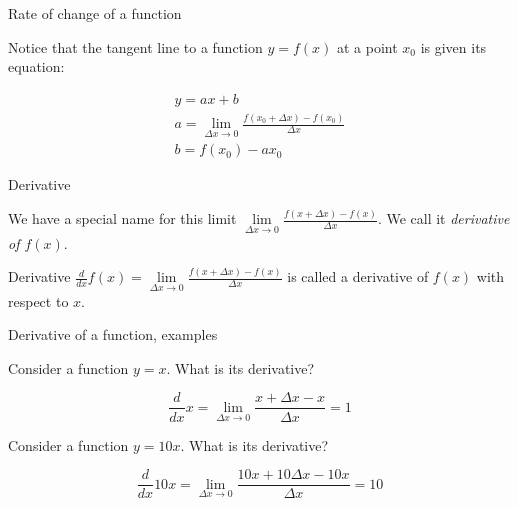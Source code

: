 \documentclass{beamer}
\begin{document}
\begin{frame}{Rate of change of a function}
	\begin{flushleft}
		
		Notice that the tangent line to a function $y = f(x)$ at a point $x_0$ is given its equation:
		
		\begin{align}
			y = ax + b \\
			a =  \lim_{\Delta x \to 0} \frac{f(x_0 + \Delta x) - f(x_0)}{\Delta x} \\
			b = f(x_0) - a x_0
		\end{align} 
		
	\end{flushleft}
\end{frame}



\begin{frame}{Derivative}
	\begin{flushleft}
		
		We have a special name for this limit $\underset{\Delta x \to 0}{\lim} \frac{f(x + \Delta x) - f(x)}{\Delta x}$. We call it \emph{derivative of $f(x)$}.
		
		\bigskip
		
		\begin{block}{Derivative}
			$\frac{d}{dx} f(x) = \underset{\Delta x \to 0}{\lim} \frac{f(x + \Delta x) - f(x)}{\Delta x}$ is called a derivative of $f(x)$ with respect to $x$.
		\end{block}
		
		
		
	\end{flushleft}
\end{frame}



\begin{frame}{Derivative of a function, examples}
	\begin{flushleft}
		
		Consider a function $y = x$. What is its derivative?
		
		\begin{equation}
			\frac{d}{dx} x= \underset{\Delta x \to 0}{\lim} \frac{x + \Delta x - x}{\Delta x} = 1
		\end{equation}
	
	\bigskip
	
	Consider a function $y = 10 x$. What is its derivative?
	
	\begin{equation}
		\frac{d}{dx} 10x = \underset{\Delta x \to 0}{\lim} \frac{10 x + 10 \Delta x - 10 x}{\Delta x} = 10
	\end{equation}
		
	\end{flushleft}
\end{frame}
\end{document}
